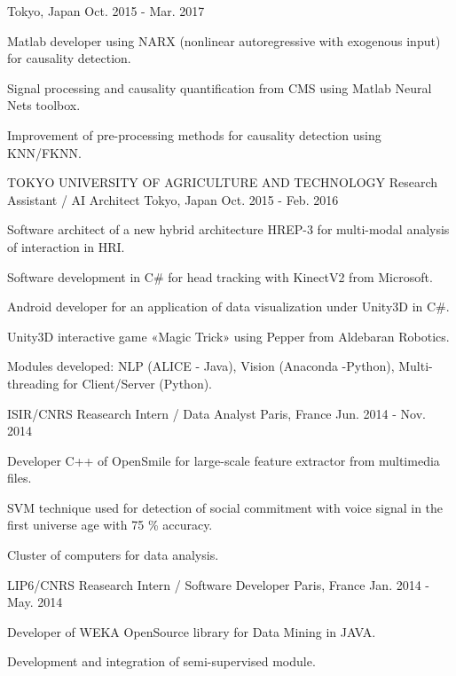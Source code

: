 \begin{cventries}
    {Tokyo, Japan}
    {Oct. 2015 - Mar. 2017}
    {
      \begin{cvitems}
        \item {Matlab developer using NARX (nonlinear autoregressive with exogenous input) for  causality detection.}
        \item {Signal processing and causality quantification from CMS using Matlab Neural Nets toolbox.}
        \item {Improvement of pre-processing methods for causality detection using KNN/FKNN.}
      \end{cvitems}
    }
  \cventry
    {TOKYO UNIVERSITY OF AGRICULTURE AND TECHNOLOGY}
    {Research Assistant / AI Architect}
    {Tokyo, Japan}
    {Oct. 2015 - Feb. 2016}
    {
      \begin{cvitems}
        \item {Software architect of a new hybrid architecture HREP-3 for multi-modal analysis of interaction in HRI.}
        \item {Software development in C\# for head tracking with KinectV2 from Microsoft.}
        \item {Android developer for an application of data visualization under Unity3D in C\#.}
        \item {Unity3D interactive game «Magic Trick» using Pepper from Aldebaran Robotics.}
         \item{Modules developed: NLP (ALICE - Java), Vision (Anaconda -Python), Multi-threading for Client/Server (Python).}
        \end{cvitems}
    }
    \cventry
    {ISIR/CNRS}
    {Reasearch Intern / Data Analyst}
    {Paris, France}
    {Jun. 2014 - Nov. 2014}
    {
      \begin{cvitems}
       \item{Developer C++ of OpenSmile for large-scale feature extractor from multimedia files.}
       \item {SVM technique used for detection of social commitment with voice signal in the first universe age with 75 \% accuracy.}
       \item {Cluster of computers for data analysis.}
      \end{cvitems}
    }
    \cventry
    {LIP6/CNRS}
    {Reasearch Intern / Software Developer}
    {Paris, France}
    {Jan. 2014 - May. 2014}
    {
      \begin{cvitems}
       \item{Developer of WEKA OpenSource library for Data Mining in JAVA. }
       \item {Development and integration of semi-supervised module.}

\end{cvitems}}
\end{cventries}
